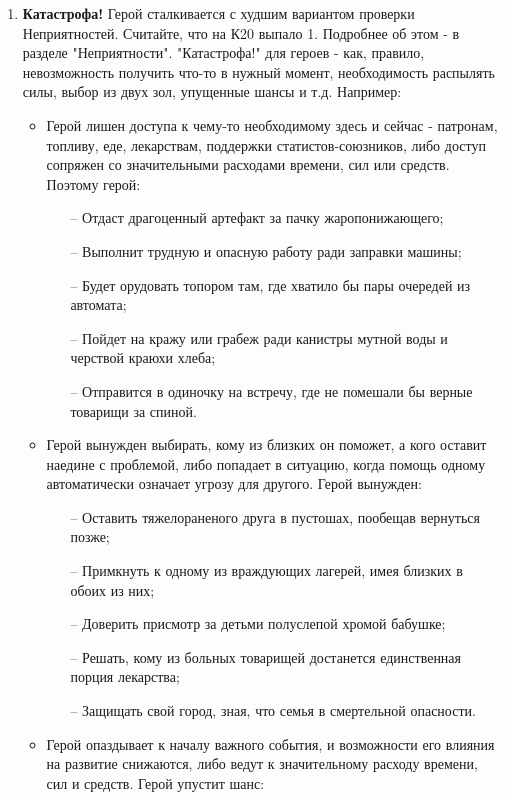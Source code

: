 \begin{enumerate}
    \item \textbf{Катастрофа!}
    \newline Герой сталкивается с худшим вариантом проверки Неприятностей. Считайте, что на К20 выпало 1. Подробнее об этом - в разделе "Неприятности".
    \newline "Катастрофа!" для героев - как, правило, невозможность получить что-то в нужный момент, необходимость распылять силы, выбор из двух зол, упущенные шансы и т.д. Например:
    \begin{itemize}
        \item Герой лишен доступа к чему-то необходимому здесь и сейчас - патронам, топливу, еде, лекарствам, поддержки статистов-союзников, либо доступ сопряжен со значительными расходами времени, сил или средств. Поэтому герой:
        \begin{itemize}
	        \item[--] Отдаст драгоценный артефакт за пачку жаропонижающего;
	        \item[--] Выполнит трудную и опасную работу ради заправки машины;
	        \item[--] Будет орудовать топором там, где хватило бы пары очередей из автомата;
	        \item[--] Пойдет на кражу или грабеж ради канистры мутной воды и черствой краюхи хлеба;
	        \item[--] Отправится в одиночку на встречу, где не помешали бы верные товарищи за спиной.
        \end{itemize}
        \item Герой вынужден выбирать, кому из близких он поможет, а кого оставит наедине с проблемой, либо попадает в ситуацию, когда помощь одному автоматически означает угрозу для другого. Герой вынужден:
        \begin{itemize}
	        \item[--] Оставить тяжелораненого друга в пустошах, пообещав вернуться позже;
	        \item[--] Примкнуть к одному из враждующих лагерей, имея близких в обоих из них;
	        \item[--] Доверить присмотр за детьми полуслепой хромой бабушке;
	        \item[--] Решать, кому из больных товарищей достанется единственная порция лекарства;
	        \item[--] Защищать свой город, зная, что семья в смертельной опасности.
        \end{itemize}
        \item Герой опаздывает к началу важного события, и возможности его влияния на развитие снижаются, либо ведут к значительному расходу времени, сил и средств. Герой упустит шанс:

\end{itemize}
\end{enumerate}
